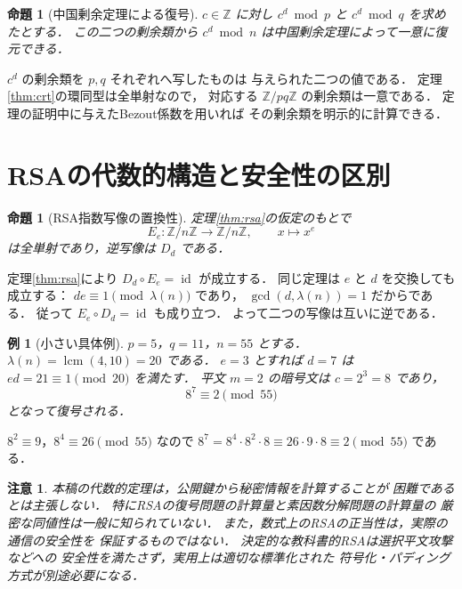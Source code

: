\documentclass[a5paper,10pt,onecolumn]{jsarticle}
\makeatletter
\theoremstyle{mathnotetheorem}
\newtheorem{proposition}[theorem]{命題}
\newtheorem{example}[theorem]{例}
\newtheorem{remark}[theorem]{注意}
\renewcommand{\proofname}{証明}
\renewenvironment{proof}[1][\proofname]{%
  \par\pushQED{\qed}\normalfont\topsep4\p@\@plus2\p@\relax
  \trivlist\item[\hskip\labelsep\bfseries #1]\ignorespaces
}{\popQED\endtrivlist\@endpefalse}
\makeatother
\begin{document}
\begin{proposition}[中国剰余定理による復号]\label{prop:crt-decrypt}
$c\in\mathbb Z$ に対し
$c^d\bmod p$ と $c^d\bmod q$ を求めたとする．
この二つの剰余類から
$c^d\bmod n$ は中国剰余定理によって一意に復元できる．
\end{proposition}
\begin{proof}
$c^d$ の剰余類を $p,q$ それぞれへ写したものは
与えられた二つの値である．
定理\ref{thm:crt}の環同型は全単射なので，
対応する $\mathbb Z/pq\mathbb Z$ の剰余類は一意である．
定理の証明中に与えたBezout係数を用いれば
その剰余類を明示的に計算できる．
\end{proof}

\section{RSAの代数的構造と安全性の区別}

\begin{proposition}[RSA指数写像の置換性]\label{prop:permutation}
定理\ref{thm:rsa}の仮定のもとで
\[
 E_e:\mathbb Z/n\mathbb Z\longrightarrow
 \mathbb Z/n\mathbb Z,\qquad x\longmapsto x^e
\]
は全単射であり，逆写像は $D_d$ である．
\end{proposition}
\begin{proof}
定理\ref{thm:rsa}により
$D_d\circ E_e=\operatorname{id}$ が成立する．
同じ定理は $e$ と $d$ を交換しても成立する：
$de\equiv1\pmod{\lambda(n)}$ であり，
$\gcd(d,\lambda(n))=1$ だからである．
従って
$E_e\circ D_d=\operatorname{id}$ も成り立つ．
よって二つの写像は互いに逆である．
\end{proof}

\begin{example}[小さい具体例]
$p=5$，$q=11$，$n=55$ とする．
$\lambda(n)=\operatorname{lcm}(4,10)=20$ である．
$e=3$ とすれば $d=7$ は
$ed=21\equiv1\pmod{20}$ を満たす．
平文 $m=2$ の暗号文は $c=2^3=8$ であり，
\[
 8^7\equiv2\pmod{55}
\]
となって復号される．
\end{example}
\begin{proof}
$8^2\equiv9$，$8^4\equiv26\pmod{55}$ なので
$8^7=8^4\cdot8^2\cdot8
\equiv26\cdot9\cdot8\equiv2\pmod{55}$
である．
\end{proof}

\begin{remark}
本稿の代数的定理は，公開鍵から秘密情報を計算することが
困難であるとは主張しない．
特にRSAの復号問題の計算量と素因数分解問題の計算量の
厳密な同値性は一般に知られていない．
また，数式上のRSAの正当性は，実際の通信の安全性を
保証するものではない．
決定的な教科書的RSAは選択平文攻撃などへの
安全性を満たさず，実用上は適切な標準化された
符号化・パディング方式が別途必要になる．
\end{remark}
\end{document}
